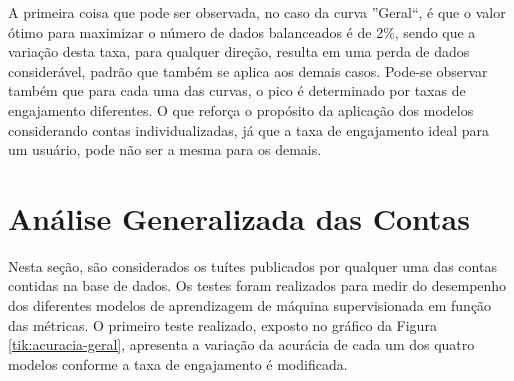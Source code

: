 \documentclass[oneside,openright,12pt]{ufsm_2015} %
\begin{document}
    \par A primeira coisa que pode ser observada, no caso da curva ''Geral``, é que o valor ótimo para maximizar o número de dados balanceados é de 2\%, sendo que a variação desta taxa, para qualquer direção, resulta em uma perda de dados considerável, padrão que também se aplica aos demais casos. Pode-se observar também que para cada uma das curvas, o pico é determinado por taxas de engajamento diferentes. O que reforça o propósito da aplicação dos modelos considerando contas individualizadas, já que a taxa de engajamento ideal para um usuário, pode não ser a mesma para os demais.
    

\section{Análise Generalizada das Contas}
\label{sec:exp-analise-geral}
    
    \par Nesta seção, são considerados os tuítes publicados por qualquer uma das contas contidas na base de dados. Os testes foram realizados para medir do desempenho dos diferentes modelos de aprendizagem de máquina supervisionada em função das métricas. O primeiro teste realizado, exposto no gráfico da Figura \ref{tik:acuracia-geral}, apresenta a variação da acurácia de cada um dos quatro modelos conforme a taxa de engajamento é modificada.
    
    \mydata
    
\end{document}
